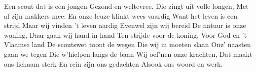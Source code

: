 \beginverse
Een scout dat is een jongen
Gezond en weltevree.
Die zingt uit volle longen,
Met al zijn makkers mee:
\endverse
\beginchorus
En onze leuze klinkt wees vaardig
Want het leven is een strijd
Maar wij vinden ’t leven aardig 
Evenwel zijn wij bereid
\endchorus
\beginverse
De natuur is onze woning,
Daar gaan wij hand in hand
Ten strijde voor de koning,
Voor God en ’t Vlaamse land
\endverse
\beginverse
De scoutswet toont de wegen
Die wij in moeten slaan
Onz’ naasten gaan we tegen
Die w’hielpen langs de baan
\endverse
\beginverse
Wij oef’nen onze krachten,
Dat maakt ons lichaam sterk
En rein zijn ons gedachten
Alsook ons woord en werk.
\endverse
\endsong